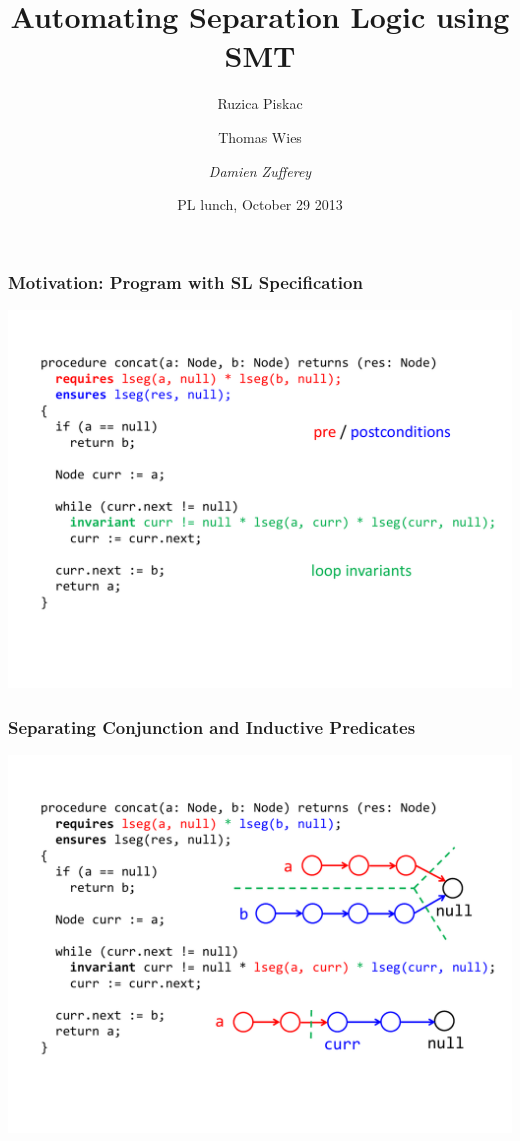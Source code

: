 \documentclass{beamer}
\title[Automating Separation Logic using SMT]{Automating Separation Logic using SMT}
\author[Damien Zufferey]{
  Ruzica Piskac \and
  Thomas Wies \and
  \emph{Damien Zufferey}
}
\institute{ Yale University \hspace{10mm} NYU \hspace{15mm} MIT CSAIL \hspace*{8mm}}
\date{PL lunch, October 29 2013}
\begin{document}
\frame[plain]{\titlepage}

\begin{frame}
  \frametitle{Motivation: Program with SL Specification}
  \includegraphics[scale=0.4]{resources/spec.pdf}
\end{frame}

\begin{frame}
  \frametitle{Separating Conjunction and Inductive Predicates}
  \includegraphics[scale=0.4]{resources/star.pdf}
\end{frame}
\end{document}
